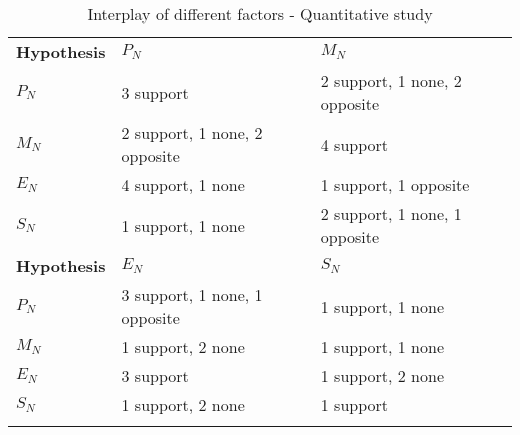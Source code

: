 \documentclass{mcmthesis}
\newlength\savedwidth
\newcommand\whline{\noalign{\global\savedwidth\arrayrulewidth
                            \global\arrayrulewidth 1.2pt}%
                   \hline
                   \noalign{\global\arrayrulewidth\savedwidth}}
\newlength\savewidth
\newcommand\shline{\noalign{\global\savewidth\arrayrulewidth
                            \global\arrayrulewidth 1.2pt}%
                   \hline
                   \noalign{\global\arrayrulewidth\savewidth}}
\begin{document}
\begin{table}[htbp]
	\renewcommand\arraystretch{1.5}
	\footnotesize
	\centering
	\begin{tabular}{m{2.7cm}<{\centering}|m{5cm}<{\centering}|m{5cm}<{\centering}}
		\whline
		\textbf{Hypothesis}&\textbf{$P_N$}&\textbf{$M_N$}\\
		\whline
		\textbf{$P_N$}&3 support &2 support, 1 none, 2 opposite\\
		
		\textbf{$M_N$}&2 support, 1 none, 2 opposite&4 support\\
		
		\textbf{$E_N$}&4 support, 1 none&1 support, 1 opposite\\
		
		\textbf{$S_N$}&1 support, 1 none&2 support, 1 none, 1 opposite\\
		\shline
		\textbf{Hypothesis}&\textbf{$E_N$}&\textbf{$S_N$}\\
		\whline
		\textbf{$P_N$}& 3 support, 1 none, 1 opposite & 1 support, 1 none\\
		
		\textbf{$M_N$}&1 support, 2 none&1 support, 1 none\\
		
		\textbf{$E_N$}&3 support&1 support, 2 none\\
		
		\textbf{$S_N$}&1 support, 2 none&1 support\\
		\shline
	\end{tabular}
	\caption{Interplay of different factors - Quantitative study}\label{tab:Interplay of different factors - Quantitative study}
\end{table}
\end{document}
